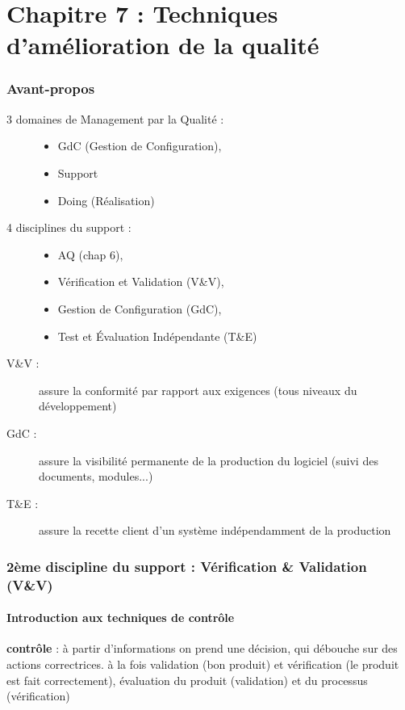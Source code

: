 \part{Chapitre 7 : Techniques d’amélioration de la qualité}

\section{Avant-propos}

\begin{description}
	\item[3 domaines de Management par la Qualité :]
	\begin{itemize}
		\item GdC (Gestion de Configuration),
		\item Support
		\item Doing (Réalisation)
	\end{itemize}

	\item[4 disciplines du support :]
	\begin{itemize}
		\item AQ (chap 6),
		\item Vérification et Validation (V\&V),
		\item Gestion de Configuration (GdC),
		\item Test et Évaluation Indépendante (T\&E)\\
	\end{itemize}
	\item[V\&V :] assure la conformité par rapport aux exigences (tous niveaux du développement)
	\item[GdC :] assure la visibilité permanente de la production du logiciel (suivi des documents, modules...)
	\item[T\&E :] assure la recette client d’un système indépendamment de la production
\end{description}

\section{2ème discipline du support : Vérification \& Validation (V\&V)}

	\subsection{Introduction aux techniques de contrôle}

\textbf{contrôle} : à partir d’informations on prend une décision, qui débouche sur des actions correctrices. à la fois validation (bon produit) et vérification (le produit est fait correctement), évaluation du produit (validation) et du processus (vérification)\\\hfill\\

